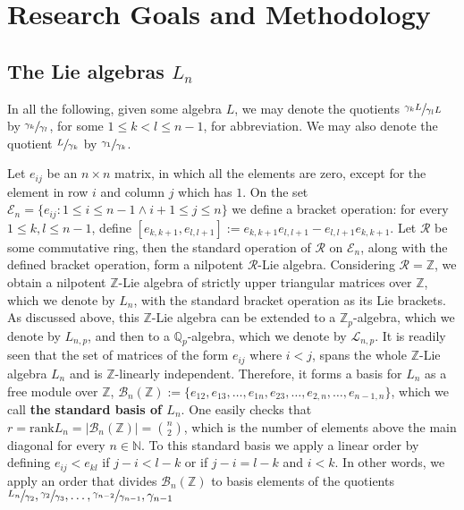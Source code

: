 \documentclass[12pt]{article}
\begin{document}
\section{Research Goals and Methodology}
\subsection{The Lie algebras $L_{n}$}
In all the following, given some algebra $L$, we may denote the quotients $\sfrac{\gamma_{k}L}{\gamma_{l}L}$ by $\sfrac{\gamma_{k}}{\gamma_{l}}$, for some $1\leq{k}<{l}\leq{n-1}$, for abbreviation. We may also denote the quotient $\sfrac{L}{\gamma_{k}}$ by $\sfrac{\gamma_{1}}{\gamma_{k}}$.\par
Let $e_{ij}$ be an $n\times{n}$ matrix, in which all the elements are zero, except for the element in row $i$ and column $j$ which has $1$. On the set $\mathcal{E}_n=\{e_{ij} : 1\leq{i}\leq{n-1}\land{{i+1}\leq{j}\leq{n}}\}$ we define a bracket operation: for every $1\leq{k,l}\leq{n-1}$, define $[e_{k,k+1},e_{l,l+1}]:=e_{k,k+1}e_{l,l+1}-e_{l,l+1}e_{k,k+1}$. Let $\mathcal{R}$ be some commutative ring, then the standard operation of $\mathcal{R}$ on $\mathcal{E}_n$, along with the defined bracket operation, form a nilpotent $\mathcal{R}$-Lie algebra. Considering $\mathcal{R}=\mathbb{Z}$, we obtain a nilpotent $\mathbb{Z}$-Lie algebra of strictly upper triangular matrices over $\mathbb{Z}$, which we denote by $L_n$, with the standard bracket operation as its Lie brackets. As discussed above, this $\mathbb{Z}$-Lie algebra can be extended to a $\mathbb{Z}_p$-algebra, which we denote by $L_{n,p}$, and then to a $\mathbb{Q}_p$-algebra, which we denote by $\mathcal{L}_{n,p}$.
It is readily seen that the set of matrices of the form $e_{ij}$ where $i<j$, spans the whole $\mathbb{Z}$-Lie algebra $L_n$ and is $\mathbb{Z}$-linearly independent. Therefore, it forms a basis for $L_n$ as a free module over $\mathbb{Z}$, $\mathcal{B}_n(\mathbb{Z}):=\{e_{12},e_{13},\dots,e_{1n},e_{23},\dots,e_{2,n},\dots,e_{n-1,n}\}$, which we call \textbf{the standard basis of $L_n$}. One easily checks that $r=\mathrm{rank}L_n=|\mathcal{B}_n(\mathbb{Z})|=\binom{n}{2}$, which is the number of elements above the main diagonal for every $n\in\mathbb{N}$. To this standard basis we apply a linear order by defining $e_{ij}<e_{kl}$ if $j-i<l-k$ or if $j-i=l-k$ and $i<k$. In other words, we apply an order that divides $\mathcal{B}_n(\mathbb{Z})$ to basis elements of the quotients $\sfrac{L_n}{\gamma_2},\sfrac{\gamma_2}{\gamma_3},\dots,\sfrac{\gamma_{n-2}}{\gamma_{n-1}},\gamma_{n-1}$
\end{document}
